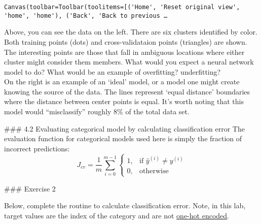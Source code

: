 \documentclass[11pt]{article}
\begin{document}
    
    \begin{verbatim}
Canvas(toolbar=Toolbar(toolitems=[('Home', 'Reset original view', 'home', 'home'), ('Back', 'Back to previous …
    \end{verbatim}

    
    Above, you can see the data on the left. There are six clusters
identified by color. Both training points (dots) and cross-validataion
points (triangles) are shown. The interesting points are those that fall
in ambiguous locations where either cluster might consider them members.
What would you expect a neural network model to do? What would be an
example of overfitting? underfitting?\\
On the right is an example of an `ideal' model, or a model one might
create knowing the source of the data. The lines represent `equal
distance' boundaries where the distance between center points is equal.
It's worth noting that this model would ``misclassify'' roughly 8\% of
the total data set.

    \#\#\# 4.2 Evaluating categorical model by calculating classification
error The evaluation function for categorical models used here is simply
the fraction of incorrect predictions:\\
\[ J_{cv} =\frac{1}{m}\sum_{i=0}^{m-1} 
\begin{cases}
    1, & \text{if $\hat{y}^{(i)} \neq y^{(i)}$}\\
    0, & \text{otherwise}
\end{cases}
\]

\#\#\# Exercise 2

Below, complete the routine to calculate classification error. Note, in
this lab, target values are the index of the category and are not
\href{https://en.wikipedia.org/wiki/One-hot}{one-hot encoded}.
\end{document}
